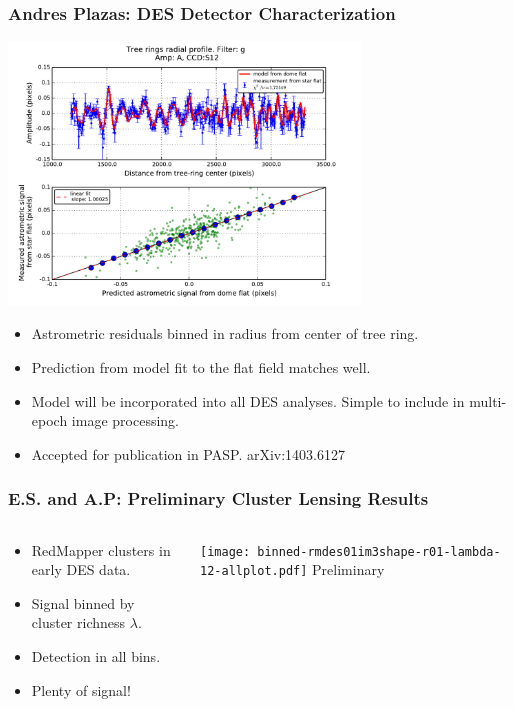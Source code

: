 \documentclass{beamer}
\begin{document}
\frame
{
    \frametitle{Andres Plazas: DES Detector Characterization}

    \begin{center}
    \includegraphics[width=0.7\textwidth]{astrometric_residuals_vs_model_S12.pdf}
\end{center}

    \fontsize{9}{0.8\baselineskip}
        \begin{itemize}
            \item Astrometric residuals binned in radius from center of tree ring.
            \item Prediction from model fit to the flat field matches well.
            \item Model will be incorporated into all DES analyses.  Simple
                to include in multi-epoch image processing.
            \item Accepted for publication in PASP.  arXiv:1403.6127
        \end{itemize}
}

\frame
{
    \frametitle{E.S. and A.P: Preliminary Cluster Lensing Results}

    \fontsize{9}{0.8\baselineskip}
    \begin{columns}
        \begin{column}{0.4\textwidth}    
            \begin{itemize}
                \item RedMapper clusters in early DES data.
                \item Signal binned by cluster richness $\lambda$.
                \item Detection in all bins.
                \item Plenty of signal!
            \end{itemize}
        \end{column}
        \begin{column}{0.6\textwidth}
            \begin{center}
                \texttt{[image: binned-rmdes01im3shape-r01-lambda-12-allplot.pdf]}
                \newline
                Preliminary
            \end{center}
        \end{column}
    \end{columns}
}
\end{document}
